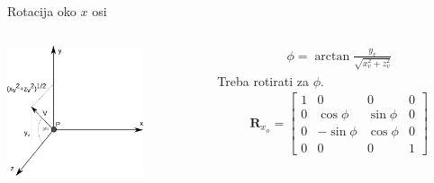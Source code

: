 \documentclass[9pt]{beamer}
\begin{document}
\begin{frame}{Rotacija oko $x$ osi}
	\begin{columns}
		\begin{column}{0.48\textwidth}
			\begin{center}
				\includegraphics[width=4cm]{./slike/p04_03.png}
			\end{center}
		\end{column}
		\begin{column}{0.48\textwidth}
			\begin{align*}
			\phi= \arctan \frac{y_v}{\sqrt{x_v^2 + z_v^2}}
			\end{align*}
			Treba rotirati za $\phi$.
			\begin{align*}
			\mathbf{R}_{x_{\phi}} =  \left[ \begin{array}{cccc}
			1 & 0 & 0 & 0 \\
			0 & \cos\phi & \sin\phi & 0 \\
			0 & -\sin\phi & \cos\phi & 0 \\
			0 & 0 & 0 & 1 
			\end{array} \right]
			\end{align*}
		\end{column}
	\end{columns}
\end{frame}
\end{document}
